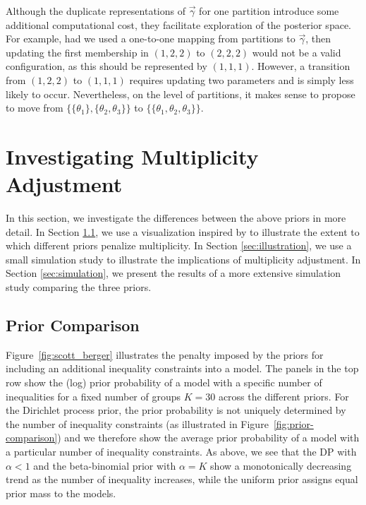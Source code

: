 \documentclass[11pt,a4paper]{article}
\theoremstyle{definition} %
\theoremstyle{case}
\begin{document}
Although the duplicate representations of $\vec{\gamma}$ for one partition introduce some additional computational cost, they facilitate exploration of the posterior space. For example, had we used a one-to-one mapping from partitions to $\vec{\gamma}$, then updating the first membership in $(1, 2, 2)$ to $(2, 2, 2)$ would not be a valid configuration, as this should be represented by $(1, 1, 1)$. However, a transition from $(1, 2, 2)$ to $(1, 1, 1)$ requires updating two parameters and is simply less likely to occur. Nevertheless, on the level of partitions, it makes sense to propose to move from $\{\{\theta_1\}, \{\theta_2, \theta_3\}\}$ to $\{\{\theta_1, \theta_2, \theta_3\}\}$.


\section{Investigating Multiplicity Adjustment} \label{sec:simulation-study}
In this section, we investigate the differences between the above priors in more detail. In Section \ref{sec:scott-berger}, we use a visualization inspired by \textcite{scott2010bayes} to illustrate the extent to which different priors penalize multiplicity. In Section \ref{sec:illustration}, we use a small simulation study to illustrate the implications of multiplicity adjustment. In Section \ref{sec:simulation}, we present the results of a more extensive simulation study comparing the three priors.

\subsection{Prior Comparison} \label{sec:scott-berger}
Figure~\ref{fig:scott_berger} illustrates the penalty imposed by the priors for including an additional inequality constraints into a model. The panels in the top row show the (log) prior probability of a model with a specific number of inequalities for a fixed number of groups $K = 30$ across the different priors. For the Dirichlet process prior, the prior probability is not uniquely determined by the number of inequality constraints (as illustrated in Figure~\ref{fig:prior-comparison}) and we therefore show the average prior probability of a model with a particular number of inequality constraints. As above, we see that the DP with $\alpha < 1$ and the beta-binomial prior with $\alpha = K$ show a monotonically decreasing trend as the number of inequality increases, while the uniform prior assigns equal prior mass to the models.
\end{document}
